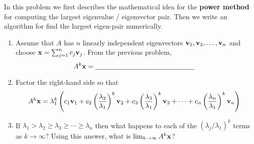 \begin{problem}
    In this problem  we first describes the mathematical idea for the {\bf power method} for
    computing the largest eigenvalue / eigenvector pair.  Then we write an algorithm for
    find the largest eigen-pair numerically.
    \begin{enumerate}
        \item Assume that $A$ has $n$ linearly independent eigenvectors ${\bf v}_1, {\bf v}_2,
            \dots, {\bf v}_n$ and choose ${\bf x} =
            \sum_{j=1}^n c_j {\bf v}_j$.  From the previous problem,
            \[ A^k {\bf x} = \underline{\hspace{2in}} \]
        \item Factor the right-hand side so that 
            \[ A^k {\bf x} = \lambda_1^k \left( c_1 {\bf v}_1 + c_2 \left(
                \frac{\lambda_2}{\lambda_1} \right)^k {\bf v}_2 + c_3 \left(
                \frac{\lambda_3}{\lambda_1}
                \right)^k {\bf v}_3 + \cdots + c_n \left( \frac{\lambda_n}{\lambda_1}
                \right)^k {\bf v}_n \right) \]
        \item If $\lambda_1 > \lambda_2 \ge \lambda_3 \ge \cdots \ge \lambda_n$ then what
            happens to each of the $(\lambda_j/\lambda_1)^k$ terms as $k \to \infty$?
            Using this answer, what is $\lim_{k \to \infty} A^k {\bf x}$?\\
    \end{enumerate}
\end{problem}


